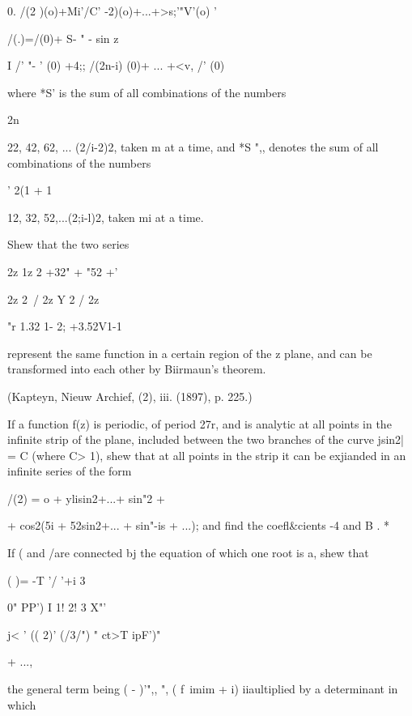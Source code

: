 \begin{wandwmiscexamples}
\begin{wandwmiscexample}
    0. /(2 )(o)+Mi'/C' -2)(o)+...+>s;'"V'(o) '

    /(.)=/(0)+ S- " - sin z

    I /' "- ' (0) +4;; /(2n-i) (0)+ ... +<v, /' (0)

    where *S' is the sum of all combinations of the numbers

    2n

    22, 42, 62, ... (2/i-2)2, taken m at a time, and *S ",, denotes the
    sum of all combinations of the numbers

    ' 2(1 + 1

    12, 32, 52,...(2;i-l)2, taken mi at a time. 
  \end{wandwmiscexample}
  \begin{wandwmiscexample}
    Shew that the two series

    2z 1z 2 +32" + "52 +'

    2z 2\ / 2z Y 2 / 2z

    "r 1.32 1- 2; +3.52V1-1

    represent the same function in a certain region of the z plane, and
    can be transformed into each other by Biirmaun's theorem.

    (Kapteyn, Nieuw Archief, (2), iii. (1897), p. 225.)
  \end{wandwmiscexample}
  \begin{wandwmiscexample}
    If a function f(z) is periodic, of period 27r, and is analytic at
    all points in the infinite strip of the plane, included between the
    two branches of the curve jsin2| = C (where C> 1), shew that at all
    points in the strip it can be exjianded in an infinite series of the
    form

    /(2) = o + ylisin2+...+ sin"2 +

    + cos2(5i + 52sin2+... + sin"-is + ...); and find the coefl\&cients
    -4 and B . *
  \end{wandwmiscexample}
  \begin{wandwmiscexample}
    If ( and /are connected bj the equation of which one root is a,
    shew that

    ( )= -T '/ '+i 3

    0" PP') I 1! 2! 3 X"'

    j< ' (( 2)' (/3/") " ct>T ipF')"

    + ...,

    the general term being ( - )'",, ", ( f\ imim + i) iiaultiplied by a
    determinant in which


\end{wandwmiscexample}
\end{wandwmiscexamples}
